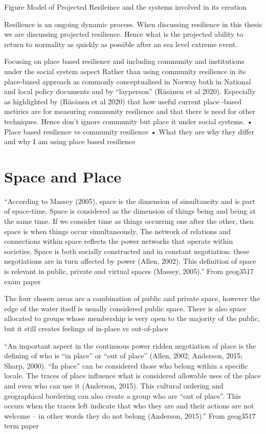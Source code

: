 \documentclass{article}
\begin{document}
\begin{frame}{Figure Model of Projected Resileince and the systems involved in its creation }
    
\end{frame}


Resilience is an ongoing dynamic process. When discussing resilience in this thesis we are discussing projected resilience. Hence what is the projected ability to return to normality as quickly as possible after an sea level extreme event. 
 
Focusing on place based resilience and including community and institutions under the social system aspect
Rather than using community resilience in its place-based approach as commonly conceptualised in Norway both in National and local policy documents and by “layperson” (Räsänen et al 2020). Especially as highlighted by (Räsänen et al 2020) that how useful current place -based metirics are for measuring community resilience and that there is need for other techniques. Hence don’t ignore community but place it under social systems. 
•	Place based resilience vs community resilience
•	What they are why they differ and why I am using place based resilience

\section{Space and Place} 
“According to Massey (2005), space is the dimension of simultaneity and is part of space-time.
Space is considered as the dimension of things being and being at the same time. If we
consider time as things occurring one after the other, then space is when things occur
simultaneously. The network of relations and connections within space reflects the power
networks that operate within societies. Space is both socially constructed and in constant
negotiation: these negotiations are in turn affected by power (Allen, 2002). This definition of
space is relevant in public, private and virtual spaces (Massey, 2005).” From geog3517 exam paper

The four chosen areas are a combination of public and private space, however the edge of the water itself is usually considered public space. There is also space allocated to groups whose membership is very open to the majority of the public, but it still creates feelings of in-place vs out-of-place


“An important aspect in the continuous power ridden negotiation of place is the defining of who is “in place” or “out of place” (Allen, 2002; Anderson, 2015; Sharp, 2000). “In place” can be considered
those who belong within a specific locale. The traces of place influence what is considered
allowable uses of the place and even who can use it (Anderson, 2015). This cultural ordering
and geographical bordering can also create a group who are “out of place”. This occurs when
the traces left indicate that who they are and their actions are not welcome – in other words
they do not belong (Anderson, 2015).” From geog3517 term paper
\end{document}
